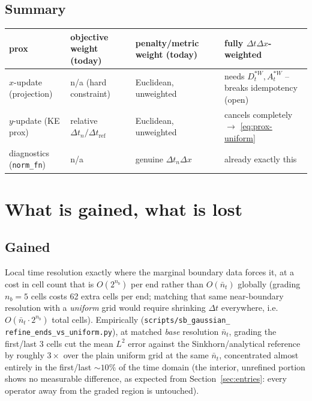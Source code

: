 \documentclass[11pt]{article}
\newcommand{\dt}{\Delta t}
\newcommand{\dx}{\Delta x}
\newcommand{\code}[1]{\texttt{#1}}
\begin{document}
\subsection*{Summary}

\begin{center}
\small
\begin{tabular}{@{}p{}p{}p{}p{}@{}}
\toprule
prox & objective weight (today) & penalty/metric weight (today) & fully $\dt\dx$-weighted \\
\midrule
$x$-update (projection) & n/a (hard constraint) & Euclidean, unweighted &
  needs $D_t^{*W},A_t^{*W}$ -- breaks idempotency (open) \\[2pt]
$y$-update (KE prox) & relative $\dt_n/\dt_\mathrm{ref}$ & Euclidean, unweighted &
  cancels completely $\to$ \eqref{eq:prox-uniform} \\[2pt]
diagnostics (\code{norm\_fn}) & n/a & genuine $\dt_n\dx$ &
  already exactly this \\
\bottomrule
\end{tabular}
\end{center}

\section{What is gained, what is lost}
\label{sec:gained-lost}

\subsection{Gained}
Local time resolution exactly where the marginal boundary data forces it, at a cost in cell
count that is $O(2^{n_b})$ per end rather than $O(\bar n_t)$ globally (grading $n_b=5$ cells
costs 62 extra cells per end; matching that same near-boundary resolution with a \emph{uniform}
grid would require shrinking $\dt$ everywhere, i.e.\ $O(\bar n_t\cdot 2^{n_b})$ total cells).
Empirically (\code{scripts/sb\_gaussian\_} \code{refine\_ends\_vs\_uniform.py}), at matched \emph{base}
resolution $\bar n_t$, grading the first/last $3$ cells cut the mean $L^2$ error against the
Sinkhorn/analytical reference by roughly $3\times$ over the plain uniform grid at the same
$\bar n_t$, concentrated almost entirely in the first/last $\sim\!10\%$ of the time domain (the
interior, unrefined portion shows no measurable difference, as expected from
Section~\ref{sec:entries}: every operator away from the graded region is untouched).
\end{document}
